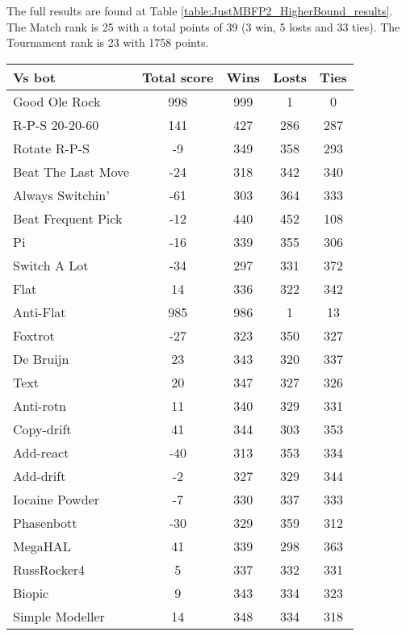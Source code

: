 The full results are found at Table \ref{table:JustMBFP2_HigherBound_results}. The Match rank is 25 with a total points of 39 (3 win, 5 losts and 33 ties). The Tournament rank is 23 with 1758 points.

\begin{table*}
    \caption{JustMBFP2_HigherBound results}
    \label{table:JustMBFP2_HigherBound_results}
    \centering
    \begin{tabular}{|l|c|c|c|c|}
        \hline
        \textbf{Vs bot} & \textbf{Total score} & \textbf{Wins} & \textbf{Losts} & \textbf{Ties} \\ \hline
Good Ole Rock & 998 & 999 & 1 & 0 \\ \hline 
R-P-S 20-20-60 & 141 & 427 & 286 & 287 \\ \hline 
Rotate R-P-S & -9 & 349 & 358 & 293 \\ \hline 
Beat The Last Move & -24 & 318 & 342 & 340 \\ \hline 
Always Switchin' & -61 & 303 & 364 & 333 \\ \hline 
Beat Frequent Pick & -12 & 440 & 452 & 108 \\ \hline 
Pi & -16 & 339 & 355 & 306 \\ \hline 
Switch A Lot & -34 & 297 & 331 & 372 \\ \hline 
Flat & 14 & 336 & 322 & 342 \\ \hline 
Anti-Flat & 985 & 986 & 1 & 13 \\ \hline 
Foxtrot & -27 & 323 & 350 & 327 \\ \hline 
De Bruijn & 23 & 343 & 320 & 337 \\ \hline 
Text & 20 & 347 & 327 & 326 \\ \hline 
Anti-rotn & 11 & 340 & 329 & 331 \\ \hline 
Copy-drift & 41 & 344 & 303 & 353 \\ \hline 
Add-react & -40 & 313 & 353 & 334 \\ \hline 
Add-drift & -2 & 327 & 329 & 344 \\ \hline 
Iocaine Powder & -7 & 330 & 337 & 333 \\ \hline 
Phasenbott & -30 & 329 & 359 & 312 \\ \hline 
MegaHAL & 41 & 339 & 298 & 363 \\ \hline 
RussRocker4 & 5 & 337 & 332 & 331 \\ \hline 
Biopic & 9 & 343 & 334 & 323 \\ \hline 
Simple Modeller & 14 & 348 & 334 & 318 \\ \hline 

\end{tabular}
\end{table*}
